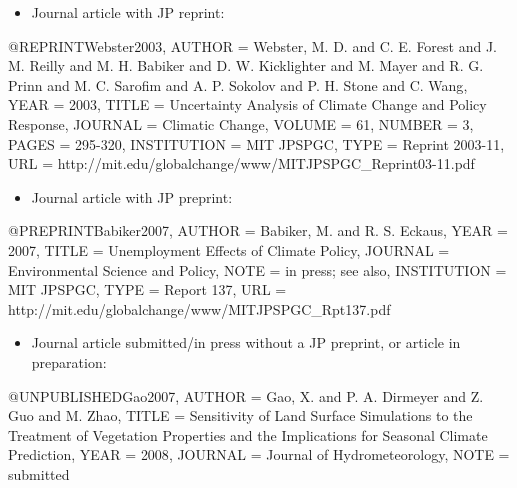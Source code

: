 \documentclass[12pt,fleqn]{article}
\let\oldverbatim\verbatim
\let\oldendverbatim\endverbatim
\renewenvironment{verbatim}{\endgraf\footnotesize\singlespace\oldverbatim}{\oldendverbatim\endsinglespace}
\begin{document}
\begin{itemize}
\item Journal article with JP reprint:
\end{itemize}
\begin{verbatim}
@REPRINT{Webster2003,
  AUTHOR = {Webster, M. D. and C. E. Forest and J. M. Reilly and M. H. Babiker
  and D. W. Kicklighter and M. Mayer and R. G. Prinn and M. C. Sarofim
  and A. P. Sokolov and P. H. Stone and C. Wang},
  YEAR = {2003},
  TITLE = {Uncertainty Analysis of Climate Change and Policy Response},
  JOURNAL = {Climatic Change},
  VOLUME = {61},
  NUMBER = {3},
  PAGES = {295-320},
  INSTITUTION = {MIT JPSPGC},
  TYPE = {Reprint 2003-11},
  URL = {http://mit.edu/globalchange/www/MITJPSPGC_Reprint03-11.pdf}}
\end{verbatim}

\begin{itemize}
\item Journal article with JP preprint:
\end{itemize}
\begin{verbatim}
@PREPRINT{Babiker2007,
  AUTHOR = {Babiker, M. and R. S. Eckaus},
  YEAR = {2007},
  TITLE = {Unemployment Effects of Climate Policy},
  JOURNAL = {Environmental Science and Policy},
  NOTE = {in press; see also},
  INSTITUTION = {MIT JPSPGC},
  TYPE = {Report 137},
  URL = {http://mit.edu/globalchange/www/MITJPSPGC_Rpt137.pdf}}
\end{verbatim}

\begin{itemize}
\item Journal article submitted/in press without a JP preprint, or article in 
preparation:
\end{itemize}
\begin{verbatim}
@UNPUBLISHED{Gao2007,
  AUTHOR = {Gao, X. and P. A. Dirmeyer and Z. Guo and M. Zhao},
  TITLE = {Sensitivity of Land Surface Simulations to the Treatment of Vegetation
  Properties and the Implications for Seasonal Climate Prediction},
  YEAR = {2008},
  JOURNAL = {Journal of Hydrometeorology},
  NOTE = {submitted}}
\end{verbatim}

\end{document}
